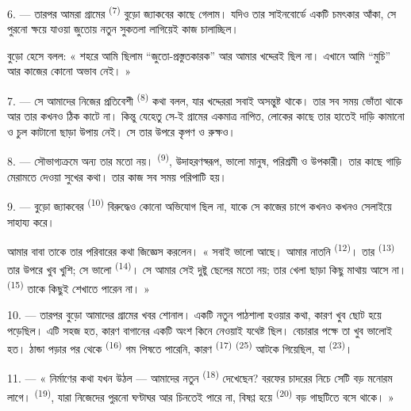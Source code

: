 6. --- তারপর আমরা গ্রামের  \textsuperscript{(7)} বুড়ো জ্যাকবের
কাছে গেলাম। যদিও তার সাইনবোর্ডে একটি চমৎকার  আঁকা, সে পুরনো
ক্ষয়ে যাওয়া জুতোয় নতুন সুকতলা লাগিয়েই কাজ চালাচ্ছিল।

বুড়ো হেসে বলল: « শহরে আমি ছিলাম “জুতো-প্রস্তুতকারক” আর আমার খদ্দেরই ছিল না।
এখানে আমি “মুচি” আর কাজের কোনো অভাব নেই। »

7. --- সে আমাদের নিজের প্রতিবেশী  \textsuperscript{(8)} কথা
বলল, যার খদ্দেররা সবাই অসন্তুষ্ট থাকে। তার  সব সময় ভোঁতা থাকে
আর তার  কখনও ঠিক কাটে না। কিন্তু যেহেতু সে-ই গ্রামের একমাত্র
নাপিত, লোকের কাছে তার হাতেই দাড়ি কামানো ও চুল কাটানো ছাড়া উপায় নেই। সে
তার উপরে কৃপণ ও রুক্ষও।

8. --- সৌভাগ্যক্রমে অন্য  তার মতো নয়।  \textsuperscript{(9)}, উদাহরণস্বরূপ, ভালো মানুষ, পরিশ্রমী ও উপকারী।
তার কাছে গাড়ি মেরামতে দেওয়া সুখের কথা। তার কাজ সব সময় পরিপাটি হয়।

9. --- বুড়ো জ্যাকবের  \textsuperscript{(10)} বিরুদ্ধেও কোনো
অভিযোগ ছিল না, যাকে সে কাজের চাপে কখনও কখনও  সেলাইয়ে
সাহায্য করে।

আমার বাবা তাকে তার পরিবারের কথা জিজ্ঞেস করলেন। « সবাই ভালো আছে। আমার নাতনি
 \textsuperscript{(12)}। তার 
\textsuperscript{(13)} তার উপরে খুব খুশি; সে ভালো 
\textsuperscript{(14)}। সে আমার সেই দুষ্টু ছেলের মতো নয়; তার খেলা ছাড়া কিছু
মাথায় আসে না।  \textsuperscript{(15)} তাকে কিছুই শেখাতে
পারেন না। »

\VUsaut{3.0mm}
\VUsaut{3.0mm}

10. --- তারপর বুড়ো আমাদের গ্রামের খবর শোনাল। একটি নতুন পাঠশালা হওয়ার কথা,
কারণ  খুব ছোট হয়ে পড়েছিল। এটি সহজ হত, কারণ
 বাগানের একটি অংশ কিনে নেওয়াই যথেষ্ট ছিল। বেচারার
পক্ষে তা খুব ভালোই হত। ঠান্ডা পড়ার পর থেকে 
\textsuperscript{(16)}  গম পিষতে পারেনি, কারণ 
\textsuperscript{(17)}  \textsuperscript{(25)} আটকে গিয়েছিল, যা
 \textsuperscript{(23)}।

11. --- « নির্মাণের কথা যখন উঠল --- আমাদের নতুন 
\textsuperscript{(18)} দেখেছেন? বরফের চাদরের নিচে সেটি বড় মনোরম লাগে।
 \textsuperscript{(19)}, যারা নিজেদের পুরনো ঘণ্টাঘর আর চিনতেই
পারে না, বিষণ্ণ হয়ে  \textsuperscript{(20)} বড় গাছটিতে বসে
থাকে। »

